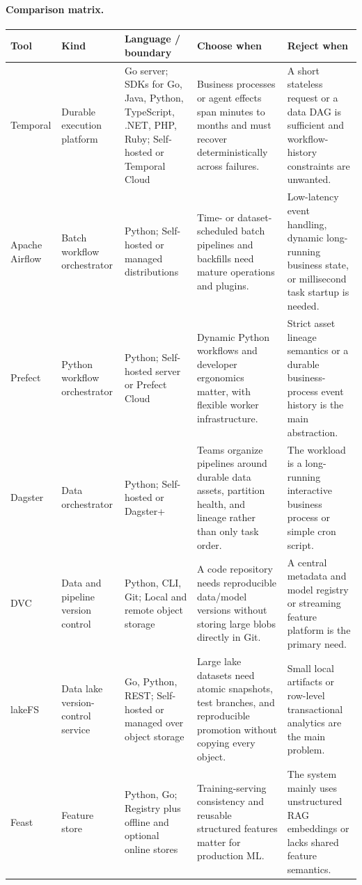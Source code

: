 \paragraph{Comparison matrix.}
\begin{longtable}{@{}p{20mm}p{22mm}p{26mm}p{46mm}p{46mm}@{}}
\toprule\textbf{Tool} & \textbf{Kind} & \textbf{Language / boundary} & \textbf{Choose when} & \textbf{Reject when}\\\midrule\endhead
Temporal & Durable execution platform & Go server; SDKs for Go, Java, Python, TypeScript, .NET, PHP, Ruby; Self-hosted or Temporal Cloud & Business processes or agent effects span minutes to months and must recover deterministically across failures. & A short stateless request or a data DAG is sufficient and workflow-history constraints are unwanted.\\
Apache Airflow & Batch workflow orchestrator & Python; Self-hosted or managed distributions & Time- or dataset-scheduled batch pipelines and backfills need mature operations and plugins. & Low-latency event handling, dynamic long-running business state, or millisecond task startup is needed.\\
Prefect & Python workflow orchestrator & Python; Self-hosted server or Prefect Cloud & Dynamic Python workflows and developer ergonomics matter, with flexible worker infrastructure. & Strict asset lineage semantics or a durable business-process event history is the main abstraction.\\
Dagster & Data orchestrator & Python; Self-hosted or Dagster+ & Teams organize pipelines around durable data assets, partition health, and lineage rather than only task order. & The workload is a long-running interactive business process or simple cron script.\\
DVC & Data and pipeline version control & Python, CLI, Git; Local and remote object storage & A code repository needs reproducible data/model versions without storing large blobs directly in Git. & A central metadata and model registry or streaming feature platform is the primary need.\\
lakeFS & Data lake version-control service & Go, Python, REST; Self-hosted or managed over object storage & Large lake datasets need atomic snapshots, test branches, and reproducible promotion without copying every object. & Small local artifacts or row-level transactional analytics are the main problem.\\
Feast & Feature store & Python, Go; Registry plus offline and optional online stores & Training-serving consistency and reusable structured features matter for production ML. & The system mainly uses unstructured RAG embeddings or lacks shared feature semantics.\\

\end{longtable}
